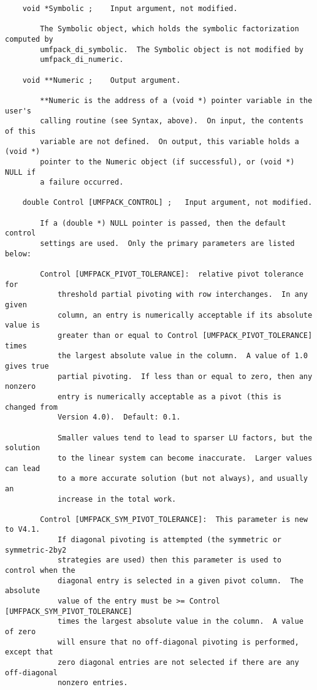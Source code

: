 \documentclass[11pt]{article}
\begin{document}
{\begin{verbatim}
    void *Symbolic ;    Input argument, not modified.

        The Symbolic object, which holds the symbolic factorization computed by
        umfpack_di_symbolic.  The Symbolic object is not modified by
        umfpack_di_numeric.

    void **Numeric ;    Output argument.

        **Numeric is the address of a (void *) pointer variable in the user's
        calling routine (see Syntax, above).  On input, the contents of this
        variable are not defined.  On output, this variable holds a (void *)
        pointer to the Numeric object (if successful), or (void *) NULL if
        a failure occurred.

    double Control [UMFPACK_CONTROL] ;   Input argument, not modified.

        If a (double *) NULL pointer is passed, then the default control
        settings are used.  Only the primary parameters are listed below:

        Control [UMFPACK_PIVOT_TOLERANCE]:  relative pivot tolerance for
            threshold partial pivoting with row interchanges.  In any given
            column, an entry is numerically acceptable if its absolute value is
            greater than or equal to Control [UMFPACK_PIVOT_TOLERANCE] times
            the largest absolute value in the column.  A value of 1.0 gives true
            partial pivoting.  If less than or equal to zero, then any nonzero
            entry is numerically acceptable as a pivot (this is changed from
            Version 4.0).  Default: 0.1.

            Smaller values tend to lead to sparser LU factors, but the solution
            to the linear system can become inaccurate.  Larger values can lead
            to a more accurate solution (but not always), and usually an
            increase in the total work.

        Control [UMFPACK_SYM_PIVOT_TOLERANCE]:  This parameter is new to V4.1.
            If diagonal pivoting is attempted (the symmetric or symmetric-2by2
            strategies are used) then this parameter is used to control when the
            diagonal entry is selected in a given pivot column.  The absolute
            value of the entry must be >= Control [UMFPACK_SYM_PIVOT_TOLERANCE]
            times the largest absolute value in the column.  A value of zero
            will ensure that no off-diagonal pivoting is performed, except that
            zero diagonal entries are not selected if there are any off-diagonal
            nonzero entries.


\end{verbatim}}
\end{document}
